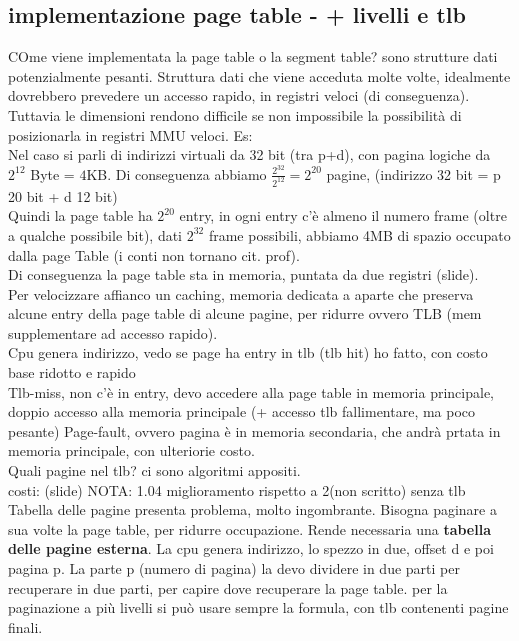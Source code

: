 \documentclass{article}
\begin{document}
 \subsection{implementazione page table - + livelli e tlb}
 COme viene implementata la page table o la segment table? sono strutture dati potenzialmente pesanti. Struttura dati che viene 
 acceduta molte volte, idealmente dovrebbero prevedere un accesso rapido, in registri veloci (di conseguenza). Tuttavia 
 le dimensioni rendono difficile se non impossibile la possibilità di posizionarla in registri MMU veloci. Es:\\
 Nel caso si parli di indirizzi virtuali da 32 bit (tra p+d), con pagina logiche da $2^12$ Byte = $4$KB. Di conseguenza abbiamo 
 $\displaystyle \frac{2^32}{2^12} = 2^20$ pagine, (indirizzo 32 bit = p 20 bit + d 12 bit)\\
 Quindi la page table ha $2^20$ entry, in ogni entry c'è almeno il numero frame (oltre a qualche possibile bit), dati $2^32$ frame possibili, abbiamo 
 4MB di spazio occupato dalla page Table (i conti non tornano cit. prof).\\
 Di conseguenza la page table sta in memoria, puntata da due registri (slide).\\
 Per velocizzare affianco un caching, memoria dedicata a aparte che preserva alcune entry della page table di alcune pagine, per ridurre
 ovvero TLB (mem supplementare ad accesso rapido).\\
 Cpu genera indirizzo, vedo se page ha entry in tlb (tlb hit) ho fatto, con costo base ridotto e rapido\\
 Tlb-miss, non c'è in entry, devo accedere alla page table in memoria principale, doppio accesso alla memoria principale (+ accesso tlb fallimentare, ma poco pesante)
 Page-fault, ovvero pagina è in memoria secondaria, che andrà prtata in memoria principale, con ulteriorie costo.\\
 Quali pagine nel tlb? ci sono algoritmi appositi.\\
 costi: (slide) NOTA: 1.04 miglioramento rispetto a 2(non scritto) senza tlb\\
 Tabella delle pagine presenta problema, molto ingombrante. Bisogna paginare a sua volte la page table, per ridurre occupazione.
 Rende necessaria una \textbf{tabella delle pagine esterna}. La cpu genera indirizzo, lo spezzo in due, offset d e poi pagina p.
 La parte p (numero di pagina) la devo dividere in due parti per recuperare in due parti, per capire dove recuperare la page table.
 per la paginazione a più livelli si può usare sempre la formula, con tlb contenenti pagine finali.
\end{document}
